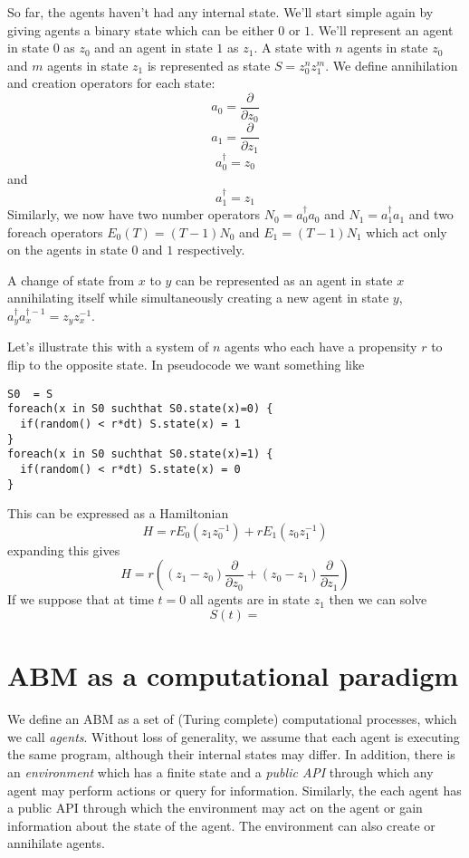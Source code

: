 \documentclass[letterpaper,twocolumn,10pt]{article}
\begin{document}
So far, the agents haven't had any internal state. We'll start simple again by giving agents a binary state which can be either $0$ or $1$. We'll represent an agent in state $0$ as $z_0$ and an agent in state $1$ as $z_1$. A state with $n$ agents in state $z_0$ and $m$ agents in state $z_1$ is represented as state $S = z_0^nz_1^m$. We define annihilation and creation operators for each state:
\[
a_0 = \frac{\partial}{\partial z_0}
\]
\[
a_1 = \frac{\partial}{\partial z_1}
\]
\[
a_0^\dag = z_0
\]
and
\[
a_1^\dag = z_1
\]
Similarly, we now have two number operators $N_0 = a_0^\dag a_0$ and $N_1 = a_1^\dag a_1$ and two foreach operators $E_0(T) = (T-1)N_0$ and $E_1 = (T-1)N_1$ which act only on the agents in state $0$ and $1$ respectively.

A change of state from $x$ to $y$ can be represented as an agent in state $x$ annihilating itself while simultaneously creating a new agent in state $y$, $a_y^\dag a_x^{\dag-1} = z_yz_x^{-1}$.

Let's illustrate this with a system of $n$ agents who each have a propensity $r$ to flip to the opposite state. In pseudocode we want something like
\begin{verbatim}
S0  = S
foreach(x in S0 suchthat S0.state(x)=0) {
  if(random() < r*dt) S.state(x) = 1
}
foreach(x in S0 suchthat S0.state(x)=1) {
  if(random() < r*dt) S.state(x) = 0
}
\end{verbatim}
 This can be expressed as a Hamiltonian
\[
H = rE_0(z_1 z_0^{-1}) + rE_1(z_0 z_1^{-1})
\]
expanding this gives
\[
H = r\left((z_1 - z_0)\frac{\partial}{\partial z_0} + (z_0 - z_1)\frac{\partial}{\partial z_1}\right)
\]
If we suppose that at time $t = 0$ all agents are in state $z_1$ then we can solve
\[
S(t) = 
\]

\section{ABM as a computational paradigm}

We define an ABM as a set of (Turing complete) computational processes, which we call \textit{agents}. Without loss of generality, we assume that each agent is executing the same program, although their internal states may differ. In addition, there is an \textit{environment} which has a finite state and a \textit{public API} through which any agent may perform actions or query for information. Similarly, the each agent has a public API through which the environment may act on the agent or gain information about the state of the agent. The environment can also create or annihilate agents.
\end{document}
